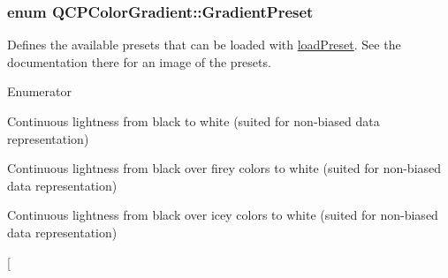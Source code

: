 \subsubsection[{\texorpdfstring{Gradient\+Preset}{GradientPreset}}]{\setlength{\rightskip}{0pt plus 5cm}enum {\bf Q\+C\+P\+Color\+Gradient\+::\+Gradient\+Preset}}\hypertarget{class_q_c_p_color_gradient_aed6569828fee337023670272910c9072}{}\label{class_q_c_p_color_gradient_aed6569828fee337023670272910c9072}
Defines the available presets that can be loaded with \hyperlink{class_q_c_p_color_gradient_aa0aeec1528241728b9671bf8e60b1622}{load\+Preset}. See the documentation there for an image of the presets. \begin{Desc}
\item[Enumerator]\par
\begin{description}
\item[{\em 
gp\+Grayscale\hypertarget{class_q_c_p_color_gradient_aed6569828fee337023670272910c9072a231b77e839ec2cf01e1573aae5bc4a35}{}\label{class_q_c_p_color_gradient_aed6569828fee337023670272910c9072a231b77e839ec2cf01e1573aae5bc4a35}
}]Continuous lightness from black to white (suited for non-\/biased data representation) \item[{\em 
gp\+Hot\hypertarget{class_q_c_p_color_gradient_aed6569828fee337023670272910c9072ad899fc6ce4f4f957a017e9e60a55196d}{}\label{class_q_c_p_color_gradient_aed6569828fee337023670272910c9072ad899fc6ce4f4f957a017e9e60a55196d}
}]Continuous lightness from black over firey colors to white (suited for non-\/biased data representation) \item[{\em 
gp\+Cold\hypertarget{class_q_c_p_color_gradient_aed6569828fee337023670272910c9072ac9e62b3462c0837b4be0855a14c63ab6}{}\label{class_q_c_p_color_gradient_aed6569828fee337023670272910c9072ac9e62b3462c0837b4be0855a14c63ab6}
}]Continuous lightness from black over icey colors to white (suited for non-\/biased data representation) \item[{\em 
}
\end{description}
\end{Desc}
